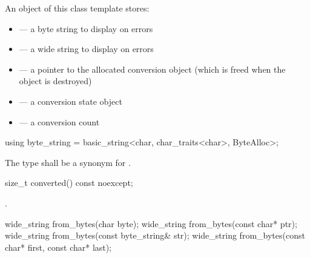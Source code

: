 \pnum
An object of this class template stores:
\begin{itemize}
\item {} --- a byte string to display on errors
\item {} --- a wide string to display on errors
\item {} --- a pointer to the allocated conversion object
(which is freed when the  object is destroyed)
\item {} --- a conversion state object
\item {} --- a conversion count
\end{itemize}

%
\begin{itemdecl}
using byte_string = basic_string<char, char_traits<char>, ByteAlloc>;
\end{itemdecl}

\begin{itemdescr}
\pnum
The type shall be a synonym for .
\end{itemdescr}

%
\begin{itemdecl}
size_t converted() const noexcept;
\end{itemdecl}

\begin{itemdescr}
\pnum
\returns
{}.
\end{itemdescr}

%
\begin{itemdecl}
wide_string from_bytes(char byte);
wide_string from_bytes(const char* ptr);
wide_string from_bytes(const byte_string& str);
wide_string from_bytes(const char* first, const char* last);
\end{itemdecl}


